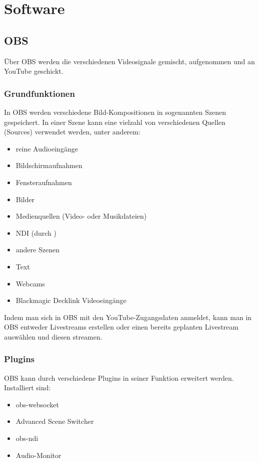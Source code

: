 \chapter{Software}
	\section{OBS}
		Über \Gls{OBS} werden die verschiedenen Videosignale gemischt, aufgenommen und an YouTube geschickt.

		\subsection{Grundfunktionen}
			In \Gls{OBS} werden verschiedene Bild-Kompositionen in sogenannten Szenen gespeichert.
			In einer Szene kann eine vielzahl von verschiedenen Quellen (Sources) verwendet werden, unter anderem:
			\begin{itemize}
				\item reine Audioeingänge
				\item Bildschirmaufnahmen
				\item Fensteraufnahmen
				\item Bilder
				\item Medienquellen (Video- oder Musikdateien)
				\item NDI (durch )
				\item andere Szenen
				\item Text
				\item Webcams
				\item Blackmagic Decklink Videoeingänge
			\end{itemize}
			Indem man sich in \Gls{OBS} mit den YouTube-Zugangsdaten anmeldet, kann man in \Gls{OBS} entweder Livestreams erstellen oder einen bereits geplanten Livestream auswählen und diesen streamen.
		\subsection{Plugins}
			\Gls{OBS} kann durch verschiedene Plugins in seiner Funktion erweitert werden.
			Installiert sind:
			\begin{itemize}
				\item obs-websocket
				\item Advanced Scene Switcher
				\item obs-ndi
				\item Audio-Monitor
			\end{itemize}

